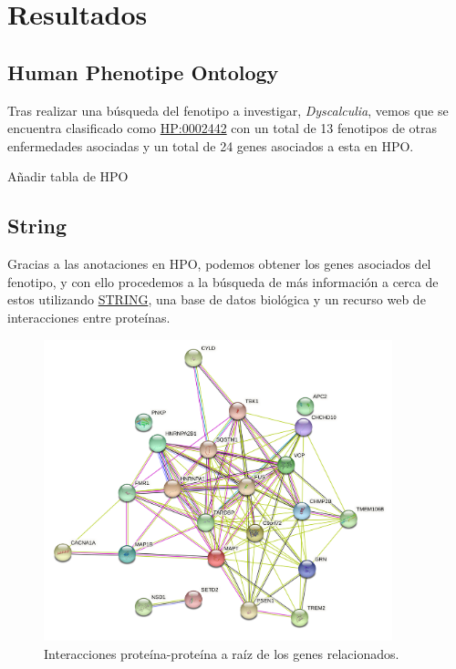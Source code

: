 \section{Resultados}

\subsection{Human Phenotipe Ontology}

\hfill

Tras realizar una búsqueda del fenotipo a investigar, \textit{Dyscalculia}, vemos que se encuentra clasificado como \href{https://hpo.jax.org/app/browse/term/HP:0002442}{HP:0002442} con un total de 13 fenotipos de otras enfermedades asociadas y un total de 24 genes asociados a esta en HPO.

Añadir tabla de HPO

\subsection{String}

\hfill

Gracias a las anotaciones en HPO, podemos obtener los genes asociados del fenotipo, y con ello procedemos a la búsqueda de más información a cerca de estos utilizando \href{https://string-db.org}{STRING}, una base de datos biológica y un recurso web de interacciones entre proteínas.

\begin{figure}[h]
	\centering
	\includegraphics[width=0.90\textwidth]{figures/Gene_Relationship.png}
	\caption{Interacciones proteína-proteína a raíz de los genes relacionados. }
	\label{fig:string1}
\end{figure}


\hfill
